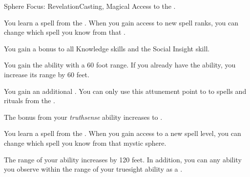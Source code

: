    \begin{feat}{Sphere Focus: Revelation}{Casting, Magical}
        \featpre Access to the  .

         You learn a spell from the  .
        When you gain access to new spell ranks, you can change which spell you know from that .

         You gain a  bonus to all Knowledge skills and the Social Insight skill.

         You gain the  ability with a 60 foot range.
        If you already have the  ability, you increase its range by 60 feet.

         You gain an additional .
        You can only use this attunement point to  to spells and rituals from the  .

         The bonus from your \textit{truthsense} ability increases to .

         You learn a spell from the  .
        When you gain access to a new spell level, you can change which spell you know from that mystic sphere.

         The range of your  ability increases by 120 feet.
        In addition, you can  any  ability you observe within the range of your truesight ability as a .
    \end{feat}


